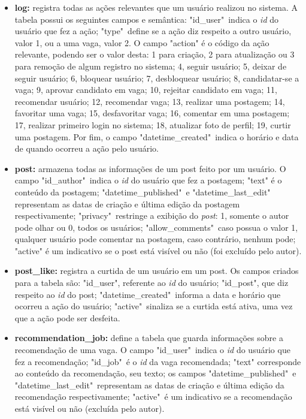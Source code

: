 \begin{itemize}
    \item \textbf{log:} registra todas as ações relevantes que um usuário realizou no sistema. A tabela possui os seguintes campos e semântica: "id\_user"\ indica o \textit{id} do usuário que fez a ação; "type"\ define se a ação diz respeito a outro usuário, valor 1, ou a uma vaga, valor 2. O campo "action" é o código da ação relevante, podendo ser o valor desta: 1 para criação, 2 para atualização ou 3 para remoção de algum registro no sistema; 4, seguir usuário; 5, deixar de seguir usuário; 6, bloquear usuário; 7, desbloquear usuário; 8, candidatar-se a vaga; 9, aprovar candidato em vaga; 10, rejeitar candidato em vaga; 11, recomendar usuário; 12, recomendar vaga; 13, realizar uma postagem; 14, favoritar uma vaga; 15, desfavoritar vaga; 16, comentar em uma postagem; 17, realizar primeiro login no sistema; 18, atualizar foto de perfil; 19, curtir uma postagem. Por fim, o campo "datetime\_created"\ indica o horário e data de quando ocorreu a ação pelo usuário.
    
    \item \textbf{post:} armazena todas as informações de um post feito por um usuário. O campo "id\_author"\ indica o \textit{id} do usuário que fez a postagem; "text" é o conteúdo da postagem; "datetime\_published"\ e "datetime\_last\_edit" representam as datas de criação e última edição da postagem respectivamente; "privacy"\ restringe a exibição do \textit{post}: 1, somente o autor pode olhar ou 0, todos os usuários; "allow\_comments"\ caso possua o valor 1, qualquer usuário pode comentar na postagem, caso contrário, nenhum pode; "active" é um indicativo se o post está visível ou não (foi excluído pelo autor).
    
    \item \textbf{post\_like:} registra a curtida de um usuário em um post. Os campos criados para a tabela são: "id\_user", referente ao \textit{id} do usuário; "id\_post", que diz respeito ao \textit{id} do post; "datetime\_created"\ informa a data e horário que ocorreu a ação do usuário; "active"\ sinaliza se a curtida está ativa, uma vez que a ação pode ser desfeita.
    
    \item \textbf{recommendation\_job:} define a tabela que guarda informações sobre a recomendação de uma vaga. O campo "id\_user"\ indica o \textit{id} do usuário que fez a recomendação; "id\_job"\ é o \textit{id} da vaga recomendada; "text" corresponde ao conteúdo da recomendação, seu texto; os campos "datetime\_published"\ e "datetime\_last\_edit"\ representam as datas de criação e última edição da recomendação respectivamente; "active"\ é um indicativo se a recomendação está visível ou não (excluída pelo autor).
    

\end{itemize}
